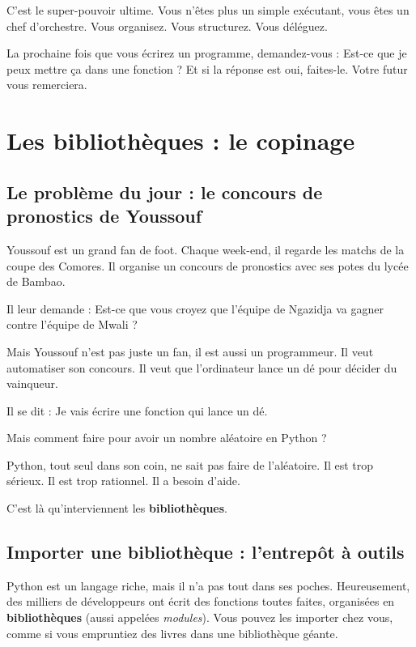 \documentclass[12pt,a4paper]{article}
\begin{document}
C'est le super-pouvoir ultime. Vous n'êtes plus un simple exécutant, vous êtes un chef d'orchestre. Vous organisez. Vous structurez. Vous déléguez.

La prochaine fois que vous écrirez un programme, demandez-vous : \og Est-ce que je peux mettre ça dans une fonction ? \fg Et si la réponse est oui, faites-le. Votre futur vous remerciera.

\section{Les bibliothèques : le copinage}

\subsection{Le problème du jour : le concours de pronostics de Youssouf}

Youssouf est un grand fan de foot. Chaque week-end, il regarde les matchs de la coupe des Comores. Il organise un concours de pronostics avec ses potes du lycée de Bambao.

Il leur demande : \og Est-ce que vous croyez que l'équipe de Ngazidja va gagner contre l'équipe de Mwali ? \fg

Mais Youssouf n'est pas juste un fan, il est aussi un programmeur. Il veut automatiser son concours. Il veut que l'ordinateur lance un dé pour décider du vainqueur.

Il se dit : \og Je vais écrire une fonction qui lance un dé. \fg

Mais comment faire pour avoir un nombre aléatoire en Python ?

Python, tout seul dans son coin, ne sait pas faire de l'aléatoire. Il est trop sérieux. Il est trop rationnel. Il a besoin d'aide.

C'est là qu'interviennent les \textbf{bibliothèques}.

\subsection{Importer une bibliothèque : l'entrepôt à outils}

Python est un langage riche, mais il n'a pas tout dans ses poches. Heureusement, des milliers de développeurs ont écrit des fonctions toutes faites, organisées en \textbf{bibliothèques} (aussi appelées \textit{modules}). Vous pouvez les importer chez vous, comme si vous empruntiez des livres dans une bibliothèque géante.
\end{document}
